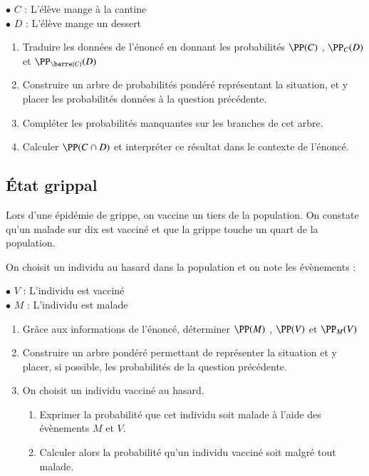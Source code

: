 \documentclass[oneside,12pt]{article}          %
\begin{document}
$\bullet$ $C$ : \og L'élève mange à la cantine \fg \\
$\bullet$ $D$ : \og L'élève mange un dessert \fg
\begin{enumerate}
	 \item Traduire les données de l'énoncé en donnant les probabilités $\PP(C)$ , $\PP_C(D)$ et $\PP_{\barre{C}}(D)$
	 \item Construire un arbre de probabilités pondéré représentant la situation, et y placer les probabilités données à la question précédente.
	 \item Compléter les probabilités manquantes sur les branches de cet arbre.
	 \item Calculer $\PP(C \cap D)$ et interpréter ce résultat dans le contexte de l'énoncé.
\end{enumerate}



\subsection{État grippal}
Lors d'une épidémie de grippe, on vaccine un tiers de la population. On constate qu'un malade sur dix est vacciné et que la grippe touche un quart de la population.

On choisit un individu au hasard dans la population et on note les évènements :

$\bullet$ $V$ : \og L'individu est vacciné \fg \\
$\bullet$ $M$ : \og L'individu est malade \fg 

\begin{enumerate}
	\item Grâce aux informations de l'énoncé, déterminer $\PP(M)$ , $\PP(V)$ et $\PP_M(V)$
	\item Construire un arbre pondéré permettant de représenter la situation et y placer, si possible, les probabilités de la question précédente.
	\item On choisit un individu vacciné au hasard.
	\begin{enumerate}
		\item Exprimer la probabilité que cet individu soit malade à l'aide des évènements $M$ et $V$.
		\item Calculer alors la probabilité qu'un individu vacciné soit malgré tout malade.
	\end{enumerate}
\end{enumerate}
\end{document}
